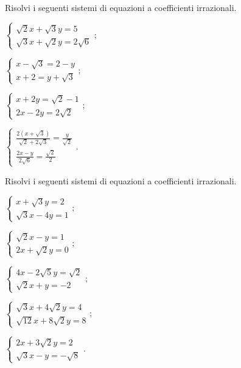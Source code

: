 \begin{esercizio}[\Ast]
 \label{ese:2.105}
Risolvi i seguenti sistemi di equazioni a coefficienti irrazionali.
 \begin{multicols}{2}
 \begin{enumeratea}
 \item $\left\{\begin{array}{l}{\sqrt 2x+\sqrt 3y=5}\\
 {\sqrt 3x+\sqrt 2y=2\sqrt 6} \end{array}\right.;$
 \item $\left\{\begin{array}{l}{x-\sqrt 3=2-y}\\
 {x+2=y+\sqrt 3} \end{array}\right.;$
 \item $\left\{\begin{array}{l}{x+2y=\sqrt 2-1}\\
 {2x-2y=2\sqrt 2} \end{array}\right.;$
 \item $\left\{\begin{array}{l}{\frac{2\left(x+\sqrt 3\right)}{\sqrt 2+2\sqrt 3}=\frac y{\sqrt 2}}\\
 {\frac{2x-y}{2\sqrt 6}=\frac{\sqrt 2} 2} \end{array}\right..$
 \end{enumeratea}
 \end{multicols}
\end{esercizio}
\pagebreak
\begin{esercizio}[\Ast]
 \label{ese:2.106}
Risolvi i seguenti sistemi di equazioni a coefficienti irrazionali.
 \begin{multicols}{2}
 \begin{enumeratea}
 \item $\left\{\begin{array}{l}x+\sqrt 3y=2\\
 \sqrt 3x-4y=1 \end{array}\right.;$
 \item $\left\{\begin{array}{l}\sqrt 2x-y=1\\
 2x+\sqrt 2y=0 \end{array}\right.;$
 \item $\left\{\begin{array}{l}4x-2\sqrt 5y=\sqrt 2\\
 \sqrt 2x+y=-2 \end{array}\right.;$
 \item $\left\{\begin{array}{l}\sqrt 3x+4\sqrt 2y=4\\
 \sqrt{12}x+8\sqrt 2y=8 \end{array}\right.;$
 \item $\left\{\begin{array}{l}2x+3\sqrt 2y=2\\
 \sqrt 3x-y=-\sqrt 8 \end{array}\right..$
 \end{enumeratea}
 \end{multicols}
\end{esercizio}


